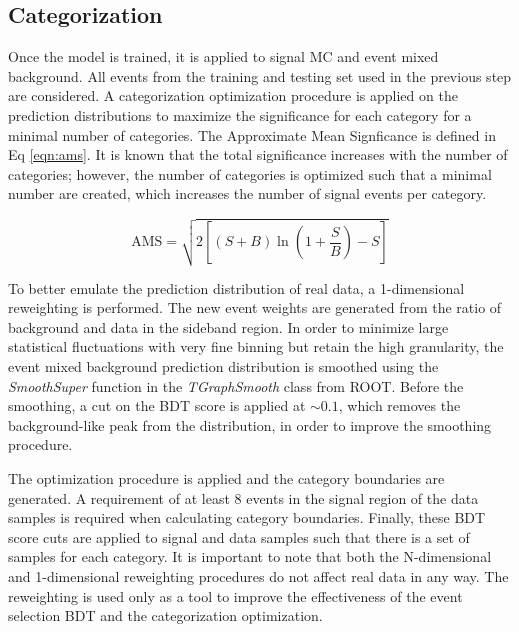\documentclass[12pt]{article}
\begin{document}
\subsection{Categorization}
Once the model is trained, it is applied to signal MC and event mixed background. All events from the training and testing set used in the previous step are considered. A categorization optimization procedure is applied on the prediction distributions to maximize the significance for each category for a minimal number of categories. The Approximate Mean Signficance is defined in Eq \ref{eqn:ams}. It is known that the total significance increases with the number of categories; however, the number of categories is optimized such that a minimal number are created, which increases the number of signal events per category.\par

\begin{equation} \label{eqn:ams}
\text{AMS} = \sqrt{2 \left[ (S + B) \ln \left(1 + \frac{S}{B}\right) - S \right]}
\end{equation}

To better emulate the prediction distribution of real data, a 1-dimensional reweighting is performed. The new event weights are generated from the ratio of background and data in the sideband region. In order to minimize large statistical fluctuations with very fine binning but retain the high granularity, the event mixed background prediction distribution is smoothed using the \textit{SmoothSuper} function in the \textit{TGraphSmooth} class from ROOT. Before the smoothing, a cut on the BDT score is applied at $\sim 0.1$, which removes the background-like peak from the distribution, in order to improve the smoothing procedure.\par

The optimization procedure is applied and the category boundaries are generated. A requirement of at least 8 events in the signal region of the data samples is required when calculating category boundaries.
Finally, these BDT score cuts are applied to signal and data samples such that there is a set of samples for each category. It is important to note that both the N-dimensional and 1-dimensional reweighting procedures do not affect real data in any way. The reweighting is used only as a tool to improve the effectiveness of the event selection BDT and the categorization optimization.\par
\end{document}
